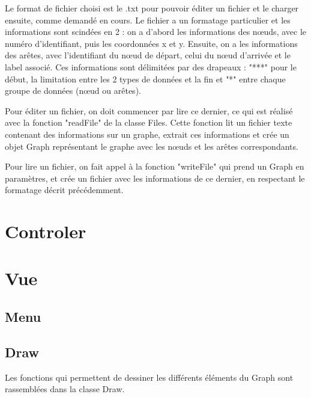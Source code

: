 \documentclass[12pt, titlepage]{article}
\begin{document}
Le format de fichier choisi est le .txt pour pouvoir éditer un fichier et le charger ensuite, comme demandé en cours. Le fichier a un formatage particulier et les informations sont scindées en 2 : on a d'abord les informations des nœuds, avec le numéro d'identifiant, puis les coordonnées x et y. Ensuite, on a les informations des arêtes, avec l'identifiant du nœud de départ, celui du nœud d'arrivée et le label associé. Ces informations sont délimitées par des drapeaux : "***" pour le début, la limitation entre les 2 types de données et la fin et "*" entre chaque groupe de données (nœud ou arêtes). 

Pour éditer un fichier, on doit commencer par lire ce dernier, ce qui est réalisé avec la fonction "readFile" de la classe Files. Cette fonction lit un fichier texte contenant des informations sur un graphe, extrait ces informations et crée un objet Graph représentant le graphe avec les nœuds et les arêtes correspondants.

Pour lire un fichier, on fait appel à la fonction "writeFile" qui prend un Graph en paramètres, et crée un fichier avec les informations de ce dernier, en respectant le formatage décrit précédemment.


\section{Controler}

\section{Vue}
\subsection{Menu}
\subsection{Draw}

Les fonctions qui permettent de dessiner les différents éléments du Graph sont rassemblées dans la classe Draw. 
\end{document}

